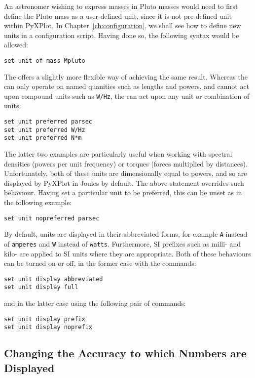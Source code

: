 An astronomer wishing to express masses in Pluto masses would need to first
define the Pluto mass as a user-defined unit, since it is not pre-defined unit
within PyXPlot. In Chapter~\ref{ch:configuration}, we shall see how to define
new units in a configuration script. Having done so, the following syntax would
be allowed:
\begin{verbatim}
set unit of mass Mpluto
\end{verbatim}

The  offers a slightly more flexible way of
achieving the same result. Whereas the  can only operate
on named quanities such as lengths and powers, and cannot act upon compound
units such as {\tt W/Hz}, the  can act upon any
unit or combination of units:
\begin{verbatim}
set unit preferred parsec
set unit preferred W/Hz
set unit preferred N*m
\end{verbatim}
The latter two examples are particularly useful when working with spectral
densities (powers per unit frequency) or torques (forces multiplied by
distances). Unfortunately, both of these units are dimensionally equal to
powers, and so are displayed by PyXPlot in Joules by default. The above
statement overrides such behaviour. Having set a particular unit to be
preferred, this can be unset as in the following example:
\begin{verbatim}
set unit nopreferred parsec
\end{verbatim}

By default, units are displayed in their abbreviated forms, for example {\tt A}
instead of {\tt amperes} and {\tt W} instead of {\tt watts}. Furthermore, SI
prefixes such as milli- and kilo- are applied to SI units where they are
appropriate. Both of these
behaviours can be turned on or off, in the former case with the commands:

\begin{verbatim}
set unit display abbreviated
set unit display full
\end{verbatim}

\noindent and in the latter case using the following pair of commands:

\begin{verbatim}
set unit display prefix
set unit display noprefix
\end{verbatim}

\subsection{Changing the Accuracy to which Numbers are Displayed}

